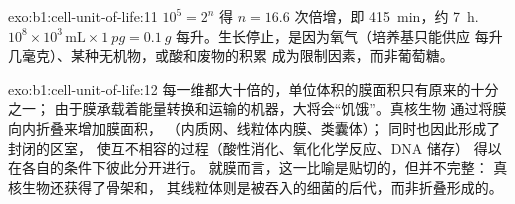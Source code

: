 \begin{solution}{exo:b1:cell-unit-of-life:11}
$10^5 = 2^{n}$ 得 $n = 16.6$ 次倍增，即 \qty{415}{min}，约
\qty{7}{h}. $10^8\times 10^3\,\mathrm{mL}\times\qty{1}{pg} = \qty{0.1}{g}$
每升。生长停止，是因为氧气（培养基只能供应
每升几毫克）、某种无机物，或酸和废物的积累
成为限制因素，而非葡萄糖。
\end{solution}

\begin{solution}{exo:b1:cell-unit-of-life:12}
每一维都大十倍的，单位体积的膜面积只有原来的十分之一；
由于膜承载着能量转换和运输的机器，大将会“饥饿”。真核生物
通过将膜向内折叠来增加膜面积，
（内质网、线粒体内膜、类囊体）；
同时也因此形成了封闭的区室，
使互不相容的过程（酸性消化、氧化化学反应、DNA 储存）
得以在各自的条件下彼此分开进行。
就膜而言，这一比喻是贴切的，但并不完整：
真核生物还获得了骨架和，
其线粒体则是被吞入的细菌的后代，而非折叠形成的。
\end{solution}

